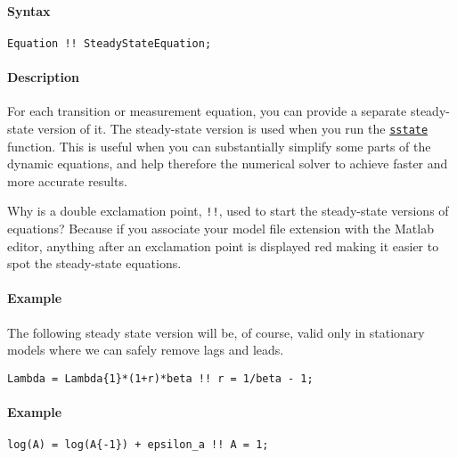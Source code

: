 


	\paragraph{Syntax}

\begin{verbatim}
Equation !! SteadyStateEquation;
\end{verbatim}

\paragraph{Description}

For each transition or measurement equation, you can provide a separate
steady-state version of it. The steady-state version is used when you
run the \href{model/sstate}{\texttt{sstate}} function. This is useful
when you can substantially simplify some parts of the dynamic equations,
and help therefore the numerical solver to achieve faster and more
accurate results.

Why is a double exclamation point, \texttt{!!}, used to start the
steady-state versions of equations? Because if you associate your model
file extension with the Matlab editor, anything after an exclamation
point is displayed red making it easier to spot the steady-state
equations.

\paragraph{Example}

The following steady state version will be, of course, valid only in
stationary models where we can safely remove lags and leads.

\begin{verbatim}
Lambda = Lambda{1}*(1+r)*beta !! r = 1/beta - 1;
\end{verbatim}

\paragraph{Example}

\begin{verbatim}
log(A) = log(A{-1}) + epsilon_a !! A = 1;
\end{verbatim}


